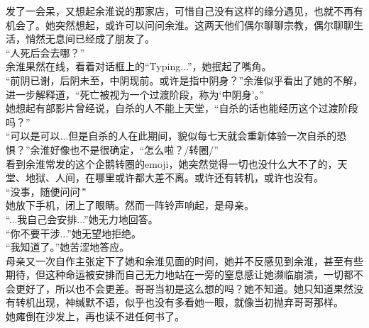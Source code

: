 \documentclass[letterpaper, 12pt]{article}
\begin{document}
\begin{multicols}{2}
发了一会呆，又想起余淮说的那家店，可惜自己没有这样的缘分遇见，也就不再有机会了。她突然想起，或许可以问问余淮。这两天他们偶尔聊聊宗教，偶尔聊聊生活，悄然无息间已经成了朋友了。\\

“人死后会去哪？”\\

余淮果然在线，看着对话框上的“Typing...”，她抿起了嘴角。\\

“前阴已谢，后阴未至，中阴现前。或许是指中阴身？”余淮似乎看出了她的不解，进一步解释道，“死亡被视为一个过渡阶段，称为‘中阴身’。”\\

她想起有部影片曾经说，自杀的人不能上天堂，“自杀的话也能经历这个过渡阶段吗？”\\

“可以是可以...但是自杀的人在此期间，貌似每七天就会重新体验一次自杀的恐惧？”余淮好像也不是很确定，“怎么啦？/转圈/”\\

看到余淮常发的这个企鹅转圈的emoji，她突然觉得一切也没什么大不了的，天堂、地狱、人间，在哪里或许都大差不离。或许还有转机，或许也没有。\\

“没事，随便问问\^\,\^”\\

她放下手机，闭上了眼睛。然而一阵铃声响起，是母亲。\\

“...我自己会安排...”她无力地回答。\\

“你不要干涉...”她无望地拒绝。\\

“我知道了。”她苦涩地答应。\\

母亲又一次自作主张定下了她和余淮见面的时间，她并不反感见到余淮，甚至有些期待，但这种命运被安排而自己无力地站在一旁的窒息感让她濒临崩溃，一切都不会更好了，所以也不会更差。哥哥当初是这么想的吗？她不知道。她只知道果然没有转机出现，神缄默不语，似乎也没有多看她一眼，就像当初抛弃哥哥那样。\\

她瘫倒在沙发上，再也读不进任何书了。\\

\end{multicols} 
\end{document}
